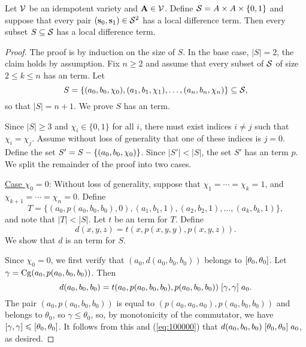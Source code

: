 \begin{theorem} %
  \label{thm:local-diff-terms}
  Let $\mathcal{V}$ be an idempotent variety and
  $\mathbf{A} \in \mathcal{V}$. Define
  $\mathcal{S}= A \times A \times \{0,1\}$
  and suppose that every pair
  $(\mathbf{s}_0, \mathbf{s}_1) \in \mathcal{S}^2$
  has a local difference term.
  Then every subset $S \subseteq \mathcal{S}$
  has a local difference term.
\end{theorem}

\begin{proof}

The proof is by induction on the size of $S$.  In the base case, $|S| = 2$,
the claim holds by assumption.
Fix $n\geq 2$ and assume that every subset of $\mathcal{S}$ of size $2\leq k \leq n$ has 
an \ld term. Let
\[
S = \{(a_0, b_0, \chi_0), (a_1, b_1, \chi_1), \dots, (a_{n}, b_{n},\chi_{n})\} 
\subseteq \mathcal{S},
\]
so that $|S| = n+1$.  We prove $S$ has an \ld term.

Since $|S| \geq 3$ and $\chi_i \in \{0,1\}$ for all $i$, there must exist
indices $i\neq j$ such that $\chi_i = \chi_j$. Assume without loss of generality
that one of these indices is $j=0$.  Define
the set
$S' = S - \{(a_0, b_0, \chi_0)\}$.
Since $|S'| < |S|$, the set $S'$ has an \ld term $p$.
We split the remainder of the proof into two cases.

\medskip

\noindent \underline{Case $\chi_0 = 0$}:
Without loss of generality, suppose that $\chi_1 = %
\cdots =\chi_k = 1$,
and $\chi_{k+1} %
= \cdots = \chi_{n} = 0$. Define %
\[T = \{(a_0, p(a_0, b_0, b_0), 0),
(a_1, b_1, 1), (a_2, b_2, 1),
\dots, (a_k, b_k, 1)\},\] and
note that $|T| < |S|$.
Let $t$ be an \ld term for $T$.
Define
\[
d(x,y,z) = t(x, p(x,y,y), p(x,y,z)).
\]
We show that $d$ is an \ld term for $S$.

Since $\chi_0 =0$, we first verify that
$(a_0, d(a_0,b_0,b_0))$ belongs to $[\theta_0, \theta_0]$.
Let $\gamma = \operatorname{Cg}(a_0, p(a_0,b_0,b_0))$. 
Then
\begin{equation}
    \label{eq:100000}
  d(a_0,b_0,b_0) =
  t(a_0, p(a_0,b_0,b_0), p(a_0,b_0,b_0))\mathrel{[\gamma, \gamma]} a_0.
\end{equation}
The pair $(a_0, p(a_0,b_0,b_0))$ is equal to
$(p(a_0,a_0,a_0), p(a_0,b_0,b_0))$ and
belongs to $\theta_0$, so $\gamma\leq \theta_0$,
so,
by monotonicity of the commutator, we have
$[\gamma, \gamma] \leqslant [\theta_0, \theta_0]$.
It follows from this and (\ref{eq:100000}) that
$d(a_0,b_0,b_0)\mathrel{[\theta_0, \theta_0]} a_0$, as desired.


\end{proof}
